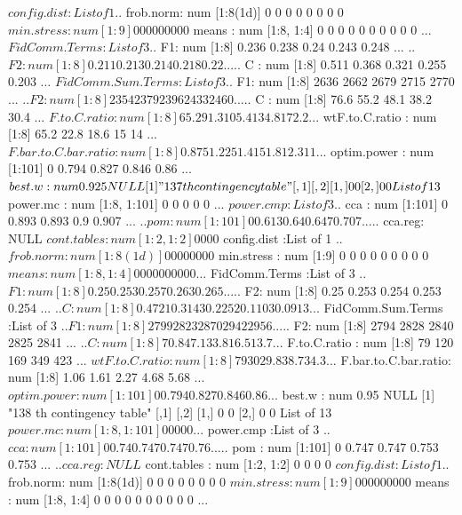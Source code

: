 \documentclass[11pt]{article} %
\begin{document}
\begin{Schunk}
\begin{Soutput}
 $ config.dist         :List of 1
  ..$ frob.norm: num [1:8(1d)] 0 0 0 0 0 0 0 0
 $ min.stress          : num [1:9] 0 0 0 0 0 0 0 0 0
 $ means               : num [1:8, 1:4] 0 0 0 0 0 0 0 0 0 0 ...
 $ FidComm.Terms       :List of 3
  ..$ F1: num [1:8] 0.236 0.238 0.24 0.243 0.248 ...
  ..$ F2: num [1:8] 0.211 0.213 0.214 0.218 0.22 ...
  ..$ C : num [1:8] 0.511 0.368 0.321 0.255 0.203 ...
 $ FidComm.Sum.Terms   :List of 3
  ..$ F1: num [1:8] 2636 2662 2679 2715 2770 ...
  ..$ F2: num [1:8] 2354 2379 2396 2433 2460 ...
  ..$ C : num [1:8] 76.6 55.2 48.1 38.2 30.4 ...
 $ F.to.C.ratio        : num [1:8] 65.2 91.3 105.4 134.8 172.2 ...
 $ wtF.to.C.ratio      : num [1:8] 65.2 22.8 18.6 15 14 ...
 $ F.bar.to.C.bar.ratio: num [1:8] 0.875 1.225 1.415 1.81 2.311 ...
 $ optim.power         : num [1:101] 0 0.794 0.827 0.846 0.86 ...
 $ best.w              : num 0.925
NULL
[1] "137 th contingency table"
     [,1] [,2]
[1,]    0    0
[2,]    0    0
List of 13
 $ power.mc            : num [1:8, 1:101] 0 0 0 0 0 ...
 $ power.cmp           :List of 3
  ..$ cca    : num [1:101] 0 0.893 0.893 0.9 0.907 ...
  ..$ pom    : num [1:101] 0 0.613 0.64 0.647 0.707 ...
  ..$ cca.reg: NULL
 $ cont.tables         : num [1:2, 1:2] 0 0 0 0
 $ config.dist         :List of 1
  ..$ frob.norm: num [1:8(1d)] 0 0 0 0 0 0 0 0
 $ min.stress          : num [1:9] 0 0 0 0 0 0 0 0 0
 $ means               : num [1:8, 1:4] 0 0 0 0 0 0 0 0 0 0 ...
 $ FidComm.Terms       :List of 3
  ..$ F1: num [1:8] 0.25 0.253 0.257 0.263 0.265 ...
  ..$ F2: num [1:8] 0.25 0.253 0.254 0.253 0.254 ...
  ..$ C : num [1:8] 0.4721 0.3143 0.2252 0.1103 0.0913 ...
 $ FidComm.Sum.Terms   :List of 3
  ..$ F1: num [1:8] 2799 2823 2870 2942 2956 ...
  ..$ F2: num [1:8] 2794 2828 2840 2825 2841 ...
  ..$ C : num [1:8] 70.8 47.1 33.8 16.5 13.7 ...
 $ F.to.C.ratio        : num [1:8] 79 120 169 349 423 ...
 $ wtF.to.C.ratio      : num [1:8] 79 30 29.8 38.7 34.3 ...
 $ F.bar.to.C.bar.ratio: num [1:8] 1.06 1.61 2.27 4.68 5.68 ...
 $ optim.power         : num [1:101] 0 0.794 0.827 0.846 0.86 ...
 $ best.w              : num 0.95
NULL
[1] "138 th contingency table"
     [,1] [,2]
[1,]    0    0
[2,]    0    0
List of 13
 $ power.mc            : num [1:8, 1:101] 0 0 0 0 0 ...
 $ power.cmp           :List of 3
  ..$ cca    : num [1:101] 0 0.74 0.747 0.747 0.76 ...
  ..$ pom    : num [1:101] 0 0.747 0.747 0.753 0.753 ...
  ..$ cca.reg: NULL
 $ cont.tables         : num [1:2, 1:2] 0 0 0 0
 $ config.dist         :List of 1
  ..$ frob.norm: num [1:8(1d)] 0 0 0 0 0 0 0 0
 $ min.stress          : num [1:9] 0 0 0 0 0 0 0 0 0
 $ means               : num [1:8, 1:4] 0 0 0 0 0 0 0 0 0 0 ...

\end{Soutput}
\end{Schunk}
\end{document}
